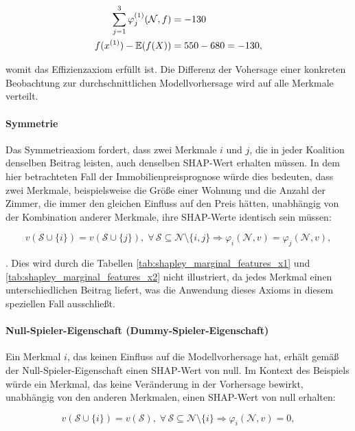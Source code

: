 \begin{align}
    \sum_{j=1}^{3}\varphi_j^{(1)}(\mathcal{N}, f) &=  -130 \\ \notag
    f(x^{(1)}) - \mathbb{E}(f(X)) &= 550 - 680 = -130,   
\end{align}

womit das Effizienzaxiom erfüllt ist. Die Differenz der Vohersage 
einer konkreten Beobachtung zur durchschnittlichen 
Modellvorhersage wird auf alle Merkmale verteilt.

\paragraph{Symmetrie}

Das Symmetrieaxiom fordert, dass zwei Merkmale $i$ und $j$, die 
in jeder Koalition denselben Beitrag leisten, auch denselben SHAP-Wert 
erhalten müssen. In dem hier betrachteten Fall der Immobilienpreisprognose 
würde dies bedeuten, dass zwei Merkmale, beispielsweise die Größe einer 
Wohnung und die Anzahl der Zimmer, die immer den gleichen Einfluss auf den Preis hätten, 
unabhängig von der Kombination anderer Merkmale, ihre SHAP-Werte identisch 
sein müssen:

\begin{equation}
    v(\mathcal{S} \cup \{i\}) = v(\mathcal{S} \cup \{j\}), \; \forall\, \mathcal{S} \subseteq \mathcal{N} \setminus \{i, j\} \Rightarrow \varphi_i (\mathcal{N}, v) = \varphi_j (\mathcal{N}, v),
\end{equation}

\cite[S. 221]{Molnar_2022}. Dies wird durch die Tabellen \ref{tab:shapley_marginal_features_x1} und \ref{tab:shapley_marginal_features_x2} 
nicht illustriert, da jedes Merkmal einen unterschiedlichen Beitrag liefert, 
was die Anwendung dieses Axioms in diesem speziellen Fall ausschließt.

\paragraph{Null-Spieler-Eigenschaft (Dummy-Spieler-Eigenschaft)}

Ein Merkmal $i$, das keinen Einfluss auf die Modellvorhersage hat, erhält gemäß der 
Null-Spieler-Eigenschaft einen SHAP-Wert von null. 
Im Kontext des Beispiels würde ein Merkmal, das keine Veränderung in der Vorhersage 
bewirkt, unabhängig von den anderen Merkmalen, einen SHAP-Wert von null erhalten:

\begin{equation}
    v(\mathcal{S} \cup \{i\}) =  v(\mathcal{S}), \; \forall\, \mathcal{S} \subseteq \mathcal{N} \setminus \{i\} \Rightarrow \varphi_i (\mathcal{N}, v) = 0,
\end{equation}

